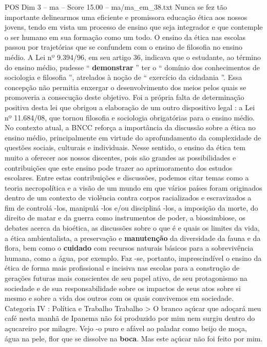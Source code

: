 \begin{textsample}{POS Dim 3 – ma – Score 15.00 – ma/ma\_em\_38.txt}
Nunca se fez tão importante delinearmos uma eficiente e promissora educação ética aos nossos jovens, tendo em vista um processo de ensino que seja integrador e que contemple o ser humano em sua formação como um todo.
O ensino da ética nas escolas passou por trajetórias que se confundem com o ensino de filosofia no ensino médio.
A Lei nº 9.394/96, em seu artigo 36, indicava que o estudante, ao término do ensino médio, pudesse “ \textbf{demonstrar} ” ter o “ domínio dos conhecimentos de sociologia e filosofia ”, atrelados à noção de “ exercício da cidadania ”.
Essa concepção não permitia enxergar o desenvolvimento dos meios pelos quais se promoveria a consecução deste objetivo.
Foi a própria falta de determinação positiva desta lei que obrigou a elaboração de um outro dispositivo legal : a Lei nº 11.684/08, que tornou filosofia e sociologia obrigatórias para o ensino médio.
No contexto atual, a BNCC reforça a importância da discussão sobre a ética no ensino médio, principalmente em virtude do aprofundamento da complexidade de questões sociais, culturais e individuais.
Nesse sentido, o ensino da ética tem muito a oferecer aos nossos discentes, pois são grandes as possibilidades e contribuições que este ensino pode trazer ao aprimoramento dos estudos escolares.
Entre estas contribuições e discussões, podemos citar temas como a teoria necropolítica e a visão de um mundo em que vários países foram originados dentro de um contexto de violência contra corpos racializados e escravizados a fim de controlá -los, manipulá -los e/ou discipliná -los, a imposição da morte, do direito de matar e da guerra como instrumentos de poder, a biossimbiose, os debates acerca da bioética, as discussões sobre o que é e quais os limites da vida, a ética ambientalista, a preservação e \textbf{manutenção} da diversidade da fauna e da flora, bem como o \textbf{cuidado} com recursos naturais básicos para a sobrevivência humana, como a água, por exemplo.
Faz -se, portanto, imprescindível o ensino da ética de forma mais profissional e incisiva nas escolas para a construção de gerações futuras mais conscientes de seu papel ativo, de seu protagonismo na sociedade e de sua responsabilidade sobre os impactos de seus atos sobre si mesmo e sobre a vida dos outros com os quais convivemos em sociedade.
Categoria IV : Política e Trabalho Trabalho > O branco açúcar que adoçará meu café nesta manhã de Ipanema não foi produzido por mim nem surgiu dentro do açucareiro por milagre.
Vejo -o puro e afável ao paladar como beijo de moça, água na pele, flor que se dissolve na \textbf{boca}.
Mas este açúcar não foi feito por mim.

\end{textsample}

